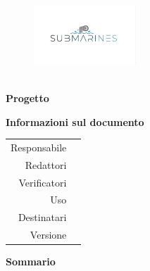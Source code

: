 \thispagestyle{empty}

\begin{figure}
	\centering
	\includegraphics[width=145px]{../template/img/logo}
\end{figure}

\hspace{2pt}

\begin{center}
	\textbf{\Large \documentName}\\[0.2cm]
	\textbf{\Large Progetto \projectName}
\end{center}

\vspace{2pt}

\begin{center}
	\groupEmail
\end{center}

\vspace{2pt}

\begin{center}
	\textbf{Informazioni sul documento}
\end{center}

\begin{table}[H]
	\centering
	\renewcommand{\arraystretch}{1.4}
	\begin{tabular}{r|l}
		Responsabile & \documentApprovers\vspace{2.5pt}\\
		Redattori & \documentEditors\vspace{2.5pt}\\
		Verificatori & \documentVerifiers\vspace{2.5pt}\\
		Uso & \documentUsage\vspace{2.5pt}\\
		Destinatari & \documentAddressee\vspace{2.5pt}\\
		Versione & \documentVersion\\
	\end{tabular}
\end{table}

\vspace{10pt}

\begin{center}
	\textbf{Sommario}\\\documentSummary
\end{center}
